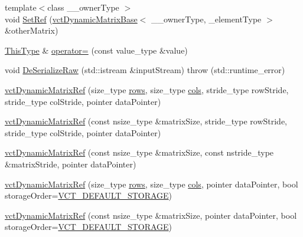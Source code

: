 \begin{DoxyCompactItemize}
\item 
{\footnotesize template$<$class \-\_\-\-\_\-owner\-Type $>$ }\\void \hyperlink{classvct_dynamic_matrix_ref_aaaaf1de3aadb8ee364a8f17f92c335b3}{Set\-Ref} (\hyperlink{classvct_dynamic_matrix_base}{vct\-Dynamic\-Matrix\-Base}$<$ \-\_\-\-\_\-owner\-Type, \-\_\-element\-Type $>$ \&other\-Matrix)
\item 
\hyperlink{classvct_dynamic_matrix_ref_ac01200e3df0afe95f5d3948da84c8551}{This\-Type} \& \hyperlink{classvct_dynamic_matrix_ref_a9fd7137b6e41a81168182823db65d5e4}{operator=} (const value\-\_\-type \&value)
\item 
void \hyperlink{classvct_dynamic_matrix_ref_af6c3423067d86655579363f3f44e2a96}{De\-Serialize\-Raw} (std\-::istream \&input\-Stream)  throw (std\-::runtime\-\_\-error)
\end{DoxyCompactItemize}
{\bf }\par
\begin{DoxyCompactItemize}
\item 
\hyperlink{classvct_dynamic_matrix_ref_a4e4ff98825a32444a82ccf10dd62686d}{vct\-Dynamic\-Matrix\-Ref} (size\-\_\-type \hyperlink{classvct_dynamic_const_matrix_base_a5eac13be2207ebeb8766cde379d73438}{rows}, size\-\_\-type \hyperlink{classvct_dynamic_const_matrix_base_aa6c51d41a100da49a7e7ac7edb20ecd9}{cols}, stride\-\_\-type row\-Stride, stride\-\_\-type col\-Stride, pointer data\-Pointer)
\item 
\hyperlink{classvct_dynamic_matrix_ref_a933bf3b1a9c32f3b83db85525066f813}{vct\-Dynamic\-Matrix\-Ref} (const nsize\-\_\-type \&matrix\-Size, stride\-\_\-type row\-Stride, stride\-\_\-type col\-Stride, pointer data\-Pointer)
\item 
\hyperlink{classvct_dynamic_matrix_ref_aed17c60197e8aac0b3dc62695ddeebce}{vct\-Dynamic\-Matrix\-Ref} (const nsize\-\_\-type \&matrix\-Size, const nstride\-\_\-type \&matrix\-Stride, pointer data\-Pointer)
\end{DoxyCompactItemize}

{\bf }\par
\begin{DoxyCompactItemize}
\item 
\hyperlink{classvct_dynamic_matrix_ref_a04a1d47d19b1f87cd6a1558698ecab2d}{vct\-Dynamic\-Matrix\-Ref} (size\-\_\-type \hyperlink{classvct_dynamic_const_matrix_base_a5eac13be2207ebeb8766cde379d73438}{rows}, size\-\_\-type \hyperlink{classvct_dynamic_const_matrix_base_aa6c51d41a100da49a7e7ac7edb20ecd9}{cols}, pointer data\-Pointer, bool storage\-Order=\hyperlink{vct_forward_declarations_8h_aacdb3b0140beef8a3c2025b808b74a73}{V\-C\-T\-\_\-\-D\-E\-F\-A\-U\-L\-T\-\_\-\-S\-T\-O\-R\-A\-G\-E})
\item 
\hyperlink{classvct_dynamic_matrix_ref_ae2b84ddbbcb23365616c01773c858946}{vct\-Dynamic\-Matrix\-Ref} (const nsize\-\_\-type \&matrix\-Size, pointer data\-Pointer, bool storage\-Order=\hyperlink{vct_forward_declarations_8h_aacdb3b0140beef8a3c2025b808b74a73}{V\-C\-T\-\_\-\-D\-E\-F\-A\-U\-L\-T\-\_\-\-S\-T\-O\-R\-A\-G\-E})
\end{DoxyCompactItemize}

